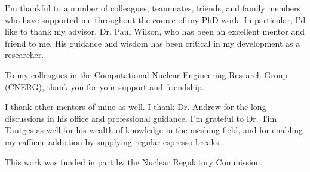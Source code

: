 



I'm thankful to a number of colleagues, teammates, friends, and family members who have supported me
throughout the course of my PhD work. In particular, I'd like to thank my
advisor, Dr. Paul Wilson, who has been an excellent mentor and friend to me. His
guidance and wisdom has been critical in my development as a researcher.

To my colleagues in the Computational Nuclear Engineering Research Group
(CNERG), thank you for your support and friendship. 

I thank other mentors of mine as well. I thank Dr. Andrew for the long
discussions in his office and professional guidance. I'm grateful to Dr. Tim Tautges as
well for his wealth of knowledge in the meshing field, and for enabling my
caffiene addiction by supplying regular espresso breaks.

This work was funded in part by the Nuclear Regulatory Commission.
